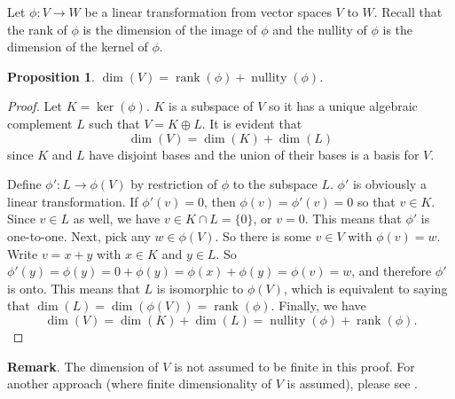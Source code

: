 \documentclass[12pt]{article}
\newtheorem{prop}{Proposition}
\def\dim{\operatorname{dim}}
\def\rank{\operatorname{rank}}
\def\ker{\operatorname{ker}}
\def\nullity{\operatorname{nullity}}
\begin{document}
Let $\phi: V\to W$ be a linear transformation from vector spaces $V$ to $W$.  Recall that the rank of $\phi$ is the dimension of the image of $\phi$ and the nullity of $\phi$ is the dimension of the kernel of $\phi$.

\begin{prop} $\dim(V)=\rank(\phi)+\nullity(\phi)$. \end{prop}

\begin{proof}  Let $K=\ker(\phi)$.  $K$ is a subspace of $V$ so it has a unique algebraic complement $L$ such that $V=K\oplus L$.  It is evident that $$\dim(V)=\dim(K)+\dim(L)$$ since $K$ and $L$ have disjoint bases and the union of their bases is a basis for $V$.  

Define $\phi': L\to \phi(V)$ by restriction of $\phi$ to the subspace $L$.  $\phi'$ is obviously a linear transformation.  If $\phi'(v)=0$, then $\phi(v)=\phi'(v)=0$ so that $v\in K$.  Since $v\in L$ as well, we have $v\in K\cap L=\lbrace 0\rbrace$, or $v=0$.  This means that $\phi'$ is one-to-one.  Next, pick any $w\in \phi(V)$.  So there is some $v\in V$ with $\phi(v)=w$.  Write $v=x+y$ with $x\in K$ and $y\in L$.  So $\phi'(y)=\phi(y)=0+\phi(y) =\phi(x)+ \phi(y) =\phi(v) =w$, and therefore $\phi'$ is onto.  This means that $L$ is isomorphic to $\phi(V)$, which is equivalent to saying that $\dim(L)=\dim(\phi(V))=\rank(\phi)$.  Finally, we have $$\dim(V)=\dim(K)+\dim(L)=\nullity(\phi)+\rank(\phi).$$
\end{proof}

\textbf{Remark}.  The dimension of $V$ is not assumed to be finite in this proof.  For another approach (where finite dimensionality of $V$ is assumed), please see .
\end{document}
